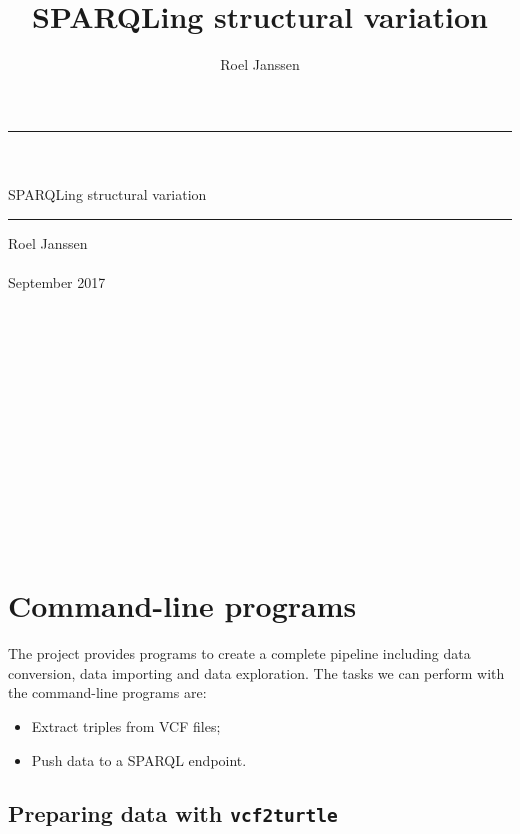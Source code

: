 \documentclass[11pt,a4paper,oneside]{book}
\title{SPARQLing structural variation}
\author{Roel Janssen}
\begin{document}
\begin{titlepage}
  \vspace*{\fill}
  \begin{center}
    \rule{\textwidth}{1.0pt}~\\~\\
    \Huge SPARQLing structural variation
    \rule{\textwidth}{1.0pt}
    \Large Roel Janssen~\\~\\
    \large September 2017
    ~\\~\\~\\~\\~\\~\\~\\~\\~\\~\\~\\~\\~\\~\\
  \end{center}
  \vspace*{\fill}

  \thispagestyle{empty}
\end{titlepage}

\setcounter{page}{1}
\hypersetup{linkcolor=black}
\tableofcontents
\newpage{}
\hypersetup{linkcolor=LinkGray}
\setcounter{page}{1}



\chapter{Command-line programs}

  The project provides programs to create a complete pipeline including
  data conversion, data importing and data exploration.  The tasks we can
  perform with the command-line programs are:
  \begin{itemize}
    \item Extract triples from VCF files;
    \item Push data to a SPARQL endpoint.
  \end{itemize}

\section{Preparing data with \texttt{vcf2turtle}}
\label{sec:vcf2turtle}
\end{document}
